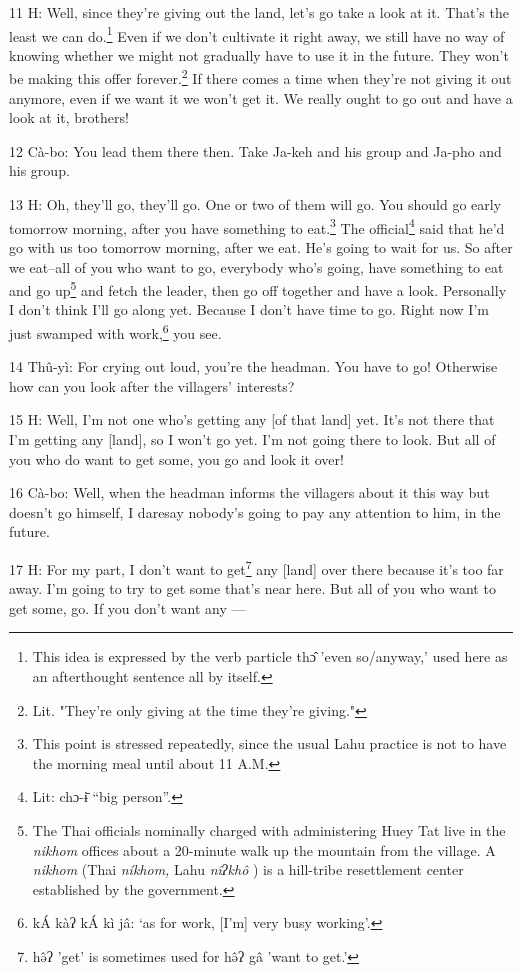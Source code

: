 11 H: Well, since they're giving out the land, let's go take a look at it. That's
the least we can do.\footnote{This idea is expressed by the verb particle thɔ̂ 'even so/anyway,' used here as an afterthought sentence all by itself.} Even if we don't cultivate it right away, we still have
no way of knowing whether we might not gradually have to use it in the future.
They won't be making this offer forever.\footnote{Lit. "They're only giving at the time they're giving."} If there comes a time when they're
not giving it out anymore, even if we want it we won't get it. We really ought
to go out and have a look at it, brothers!

12 Cà-bo: You lead them there then. Take Ja-keh and his group and Ja-pho and his
group.

13 H: Oh, they'll go, they'll go. One or two of them will go. You should go early
tomorrow morning, after you have something to eat.\footnote{This point is stressed repeatedly, since the usual Lahu practice is not to have the morning meal until about 11 A.M.} The official\footnote{Lit: chɔ-ɨ̄ ``big person''.} said that
he'd go with us too tomorrow morning, after we eat. He's going to wait for us.
So after we eat--all of you who want to go, everybody who's going, have something
to eat and go up\footnote{The Thai officials nominally charged with administering Huey Tat live in the \textit{nikhom } offices about a 20-minute walk up the mountain from the village. A  \textit{nikhom } (Thai  \textit{níkhom,  }Lahu  \textit{nîʔkhô }) is a hill-tribe resettlement center established by the government.} and fetch the leader, then go off together and have a look.
Personally I don't think I'll go along yet. Because I don't have time to go. Right
now I'm just swamped with work,\footnote{kÁ kàʔ kÁ kì jâ: `as for work, [I'm] very busy working'.} you see.

14 Thû-yì: For crying out loud, you're the headman. You have to go! Otherwise
how can you look after the villagers' interests?

15 H: Well, I'm not one who's getting any [of that land] yet. It's not there that
I'm getting any [land], so I won't go yet. I'm not going there to look. But all
of you who do want to get some, you go and look it over!

16 Cà-bo: Well, when the headman informs the villagers about it this way but doesn't
go himself, I daresay nobody's going to pay any attention to him, in the future.

17 H: For my part, I don't want to get\footnote{hə̂ʔ 'get' is sometimes used for hə̂ʔ gâ 'want to get.'} any [land] over there because it's too
far away. I'm going to try to get some that's near here. But all of you who want
to get some, go. If you don't want any ---

